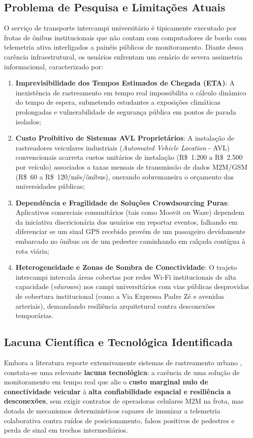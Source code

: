 \documentclass[lettersize,journal]{IEEEtran}
\begin{document}
\subsection{Problema de Pesquisa e Limitações Atuais}
O serviço de transporte intercampi universitário é tipicamente executado por frotas de ônibus institucionais que não contam com computadores de bordo com telemetria ativa interligados a painéis públicos de monitoramento. Diante dessa carência infraestrutural, os usuários enfrentam um cenário de severa assimetria informacional, caracterizado por:
\begin{enumerate}
    \item \textbf{Imprevisibilidade dos Tempos Estimados de Chegada (ETA)}: A inexistência de rastreamento em tempo real impossibilita o cálculo dinâmico do tempo de espera, submetendo estudantes a exposições climáticas prolongadas e vulnerabilidade de segurança pública em pontos de parada isolados;
    \item \textbf{Custo Proibitivo de Sistemas AVL Proprietários}: A instalação de rastreadores veiculares industriais (\textit{Automated Vehicle Location} - AVL) convencionais acarreta custos unitários de instalação (R\$~1.200 a R\$~2.500 por veículo) associados a taxas mensais de transmissão de dados M2M/GSM (R\$~60 a R\$~120/mês/ônibus), onerando sobremaneira o orçamento das universidades públicas;
    \item \textbf{Dependência e Fragilidade de Soluções Crowdsourcing Puras}: Aplicativos comerciais comunitários (tais como Moovit ou Waze) dependem da iniciativa discricionária dos usuários em reportar eventos, falhando em diferenciar se um sinal GPS recebido provém de um passageiro devidamente embarcado no ônibus ou de um pedestre caminhando em calçada contígua à rota viária;
    \item \textbf{Heterogeneidade e Zonas de Sombra de Conectividade}: O trajeto intercampi intercala áreas cobertas por redes Wi-Fi institucionais de alta capacidade (\textit{eduroam}) nos campi universitários com vias públicas desprovidas de cobertura institucional (como a Via Expressa Padre Zé e avenidas arteriais), demandando resiliência arquitetural contra desconexões temporárias.
\end{enumerate}

\subsection{Lacuna Científica e Tecnológica Identificada}
Embora a literatura reporte extensivamente sistemas de rastreamento urbano \cite{ref_avl_cost,ref_crowd_transit}, constata-se uma relevante \textbf{lacuna tecnológica}: a carência de uma solução de monitoramento em tempo real que alie o \textbf{custo marginal nulo de conectividade veicular} à \textbf{alta confiabilidade espacial e resiliência a desconexões}, sem exigir contratos de operadoras celulares M2M na frota, mas dotada de mecanismos determinísticos capazes de imunizar a telemetria colaborativa contra ruídos de posicionamento, falsos positivos de pedestres e perda de sinal em trechos intermediários.
\end{document}
